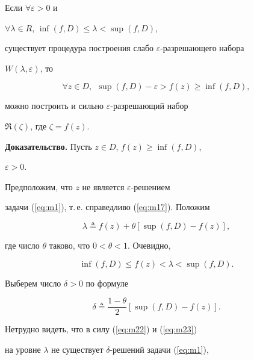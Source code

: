 \begin{prop}\label{Prop2} Если $\forall \varepsilon >0$ и


$\forall \lambda \in R$, \; $\inf(f,D) \leq \lambda < \sup (f,D)$,


существует процедура построения слабо $\varepsilon$-разрешающего набора


$W (\lambda, \varepsilon)$, то


$$


\forall z\in D, \ \ \sup(f,D) - \varepsilon > f(z) \geq \inf (f,D),


$$ 


можно построить и сильно $\varepsilon$-разрешающий набор


$\Re (\zeta)$, где $\zeta=f(z)$.


\end{prop}





{\bf Доказательство.} Пусть $ z\in D$, $f(z) \geq \inf (f,D)$,


$\varepsilon >0$.


Предположим, что $z$ не является $\varepsilon$-решением


задачи (\ref{eq:m1}), т.\,е. справедливо (\ref{eq:m17}). Положим


\begin{equation}


\lambda\triangleq f(z)+\theta[\sup(f,D)-f(z)],


\label{eq:m22}


\end{equation}


где число $\theta$ таково, что $0< \theta <1$. Очевидно,


$$


\inf(f,D) \leq f(z) < \lambda < \sup (f,D).


$$


Выберем число $\delta > 0$ по формуле


\begin{equation}


\delta \triangleq\frac{1- \theta}{2}[\sup(f,D)-f(z)].


\label{eq:m23}


\end{equation}


Нетрудно видеть, что в силу (\ref{eq:m22}) и (\ref{eq:m23})


на уровне $\lambda$ не существует $\delta$-решений задачи (\ref{eq:m1}),


